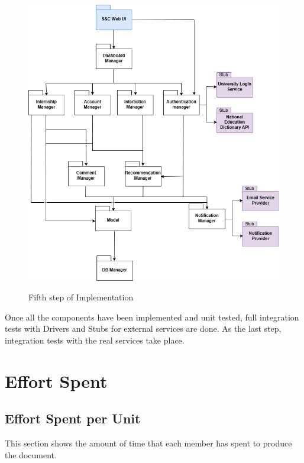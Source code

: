 \documentclass[a4paper,12pt]{article}
\begin{document}
\begin{figure}[H]
\centering
\includegraphics[scale = 0.7]{DD_figures/ImplementationDiagrams/FifthStep.png}\\
\caption{Fifth step of Implementation}
\end{figure}
Once all the components have been implemented and unit tested, full integration tests with Drivers and Stubs for external services are done. As the last step, integration tests with the
real services take place.
\newpage

\section{Effort Spent}
\subsection{Effort Spent per Unit}
This section shows the amount of time that each member has spent to produce the document. 
\end{document}
